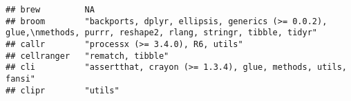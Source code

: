 \documentclass[]{book}
\begin{document}
\begin{verbatim}
## brew         NA                                                                                                                                                                                                                                                                                                                                                                                                                                                                                                          
## broom        "backports, dplyr, ellipsis, generics (>= 0.0.2), glue,\nmethods, purrr, reshape2, rlang, stringr, tibble, tidyr"                                                                                                                                                                                                                                                                                                                                                                                           
## callr        "processx (>= 3.4.0), R6, utils"                                                                                                                                                                                                                                                                                                                                                                                                                                                                            
## cellranger   "rematch, tibble"                                                                                                                                                                                                                                                                                                                                                                                                                                                                                           
## cli          "assertthat, crayon (>= 1.3.4), glue, methods, utils, fansi"                                                                                                                                                                                                                                                                                                                                                                                                                                                
## clipr        "utils"                                                                                                                                                                                                                                                                                                                                                                                                                                                                                                     

\end{verbatim}
\end{document}
